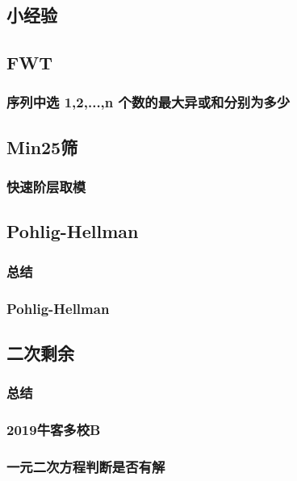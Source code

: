 \documentclass[10pt,a4paper]{article}
\begin{document}
\subsection{小经验}

\subsection{FWT}
\subsubsection{序列中选 1,2,...,n 个数的最大异或和分别为多少}

\subsection{Min25筛}
\subsubsection{快速阶层取模}

\subsection{Pohlig-Hellman}
\subsubsection{总结}

\subsubsection{Pohlig-Hellman}

\subsection{二次剩余}
\subsubsection{总结}

\subsubsection{2019牛客多校B}

\subsubsection{一元二次方程判断是否有解}

\end{document}
